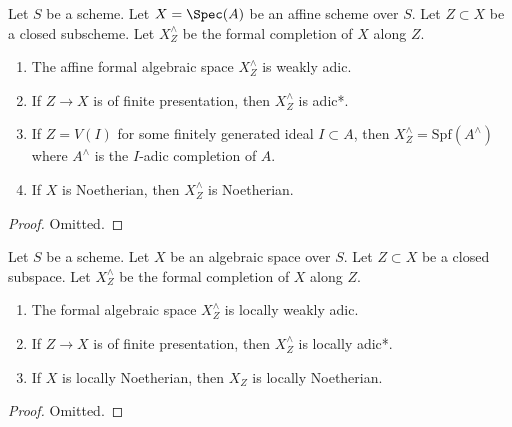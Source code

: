 \begin{lemma}
\label{lemma-affine-formal-completion-subspace-types}
Let $S$ be a scheme. Let $X = \Spec(A)$ be an affine scheme over $S$.
Let $Z \subset X$ be a closed subscheme. Let $X^\wedge_Z$ be the
formal completion of $X$ along $Z$.
\begin{enumerate}
\item The affine formal algebraic space $X^\wedge_Z$ is weakly adic.
\item If $Z \to X$ is of finite presentation, then $X^\wedge_Z$ is adic*.
\item If $Z = V(I)$ for some finitely generated ideal $I \subset A$,
then $X^\wedge_Z = \text{Spf}(A^\wedge)$ where $A^\wedge$ is the
$I$-adic completion of $A$.
\item If $X$ is Noetherian, then $X^\wedge_Z$ is Noetherian.
\end{enumerate}
\end{lemma}

\begin{proof}
Omitted.
\end{proof}

\begin{lemma}
\label{lemma-formal-completion-subspace-types}
Let $S$ be a scheme. Let $X$ be an algebraic space over $S$.
Let $Z \subset X$ be a closed subspace. Let $X^\wedge_Z$ be the
formal completion of $X$ along $Z$.
\begin{enumerate}
\item The formal algebraic space $X^\wedge_Z$ is locally weakly adic.
\item If $Z \to X$ is of finite presentation,
then $X^\wedge_Z$ is locally adic*.
\item If $X$ is locally Noetherian, then $X_Z$ is locally
Noetherian.
\end{enumerate}
\end{lemma}

\begin{proof}
Omitted.
\end{proof}











